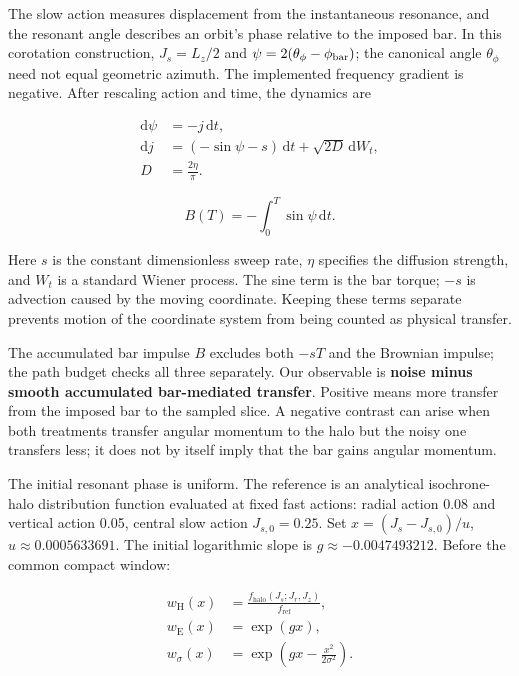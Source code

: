 \documentclass[fleqn,usenatbib]{mnras}
\begin{document}
The slow action measures displacement from the instantaneous resonance, and the resonant angle describes an orbit's phase relative to the imposed bar. In this corotation construction, \(J_s=L_z/2\) and \(\psi=2(\theta_\phi-\phi_{\rm bar})\); the canonical angle \(\theta_\phi\) need not equal geometric azimuth. The implemented frequency gradient is negative. After rescaling action and time, the dynamics are

\begin{equation}\label{EQ-DYN-01}
\begin{aligned}
\mathrm d\psi &= -j\,\mathrm dt,\\
\mathrm dj &= (-\sin\psi-s)\,\mathrm dt + \sqrt{2D}\,\mathrm dW_t,\\
D &= \frac{2\eta}{\pi}.
\end{aligned}
\end{equation}

\begin{equation}\label{EQ-OBS-01}
B(T)=-\int_0^T\sin\psi\,\mathrm dt.
\end{equation}

Here \(s\) is the constant dimensionless sweep rate, \(\eta\) specifies the diffusion strength, and \(W_t\) is a standard Wiener process. The sine term is the bar torque; \(-s\) is advection caused by the moving coordinate. Keeping these terms separate prevents motion of the coordinate system from being counted as physical transfer.

The accumulated bar impulse \(B\) excludes both \(-sT\) and the Brownian impulse; the path budget checks all three separately. Our observable is \textbf{noise minus smooth accumulated bar-mediated transfer}. Positive means more transfer from the imposed bar to the sampled slice. A negative contrast can arise when both treatments transfer angular momentum to the halo but the noisy one transfers less; it does not by itself imply that the bar gains angular momentum.

The initial resonant phase is uniform. The reference is an analytical isochrone-halo distribution function evaluated at fixed fast actions: radial action 0.08 and vertical action 0.05, central slow action \(J_{s,0}=0.25\). Set \(x=(J_s-J_{s,0})/u\), \(u\approx0.0005633691\). The initial logarithmic slope is \(g\approx-0.0047493212\). Before the common compact window:

\begin{equation}\label{EQ-POP-01}
\begin{aligned}
w_{\mathrm H}(x)&=\frac{f_{\mathrm{halo}}(J_s;J_r,J_z)}{f_{\mathrm{ref}}},\\
w_{\mathrm E}(x)&=\exp(gx),\\
w_{\sigma}(x)&=\exp\!\left(gx-\frac{x^2}{2\sigma^2}\right).
\end{aligned}
\end{equation}
\end{document}
